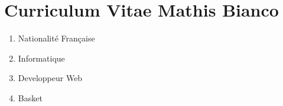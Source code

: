 \documentclass[12pt]{article}
\begin{document}
	\part{Curriculum Vitae Mathis Bianco}
	\begin{enumerate}
		\item Nationalité Française
		\item Informatique
		\item Developpeur Web
		\item Basket
	\end{enumerate}
\end{document}
